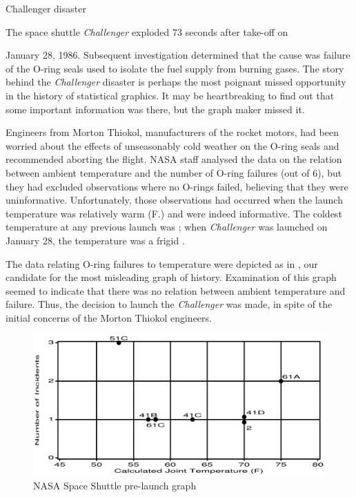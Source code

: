 \begin{Example}[nasa]{Challenger disaster}
\begin{changebar}
The space shuttle \emph{Challenger} exploded 73 seconds after take-off on
\end{changebar} 
January 28, 1986.
Subsequent investigation determined that the cause was failure of the O-ring
seals used to isolate the fuel supply from burning gases.
The story behind the \emph{Challenger} disaster is perhaps the most poignant
missed opportunity in the history of statistical graphics.
It may be heartbreaking to find out that some important information
was there, but the graph maker missed it.

Engineers from Morton Thiokol, manufacturers of the rocket motors,
had been worried about the effects of unseasonably cold weather
on the O-ring seals and recommended aborting the flight.
NASA staff analysed the data on the relation between ambient temperature
and the number of O-ring failures (out of 6), but they had excluded observations
where no O-rings failed,
believing that they were uninformative.
Unfortunately, those observations had occurred when the launch temperature
was relatively warm (F.) and were indeed informative.
The coldest temperature at any previous launch was ;  when \emph{Challenger} was launched on January 28,
the temperature was a frigid .

The data relating O-ring failures to temperature were depicted as in
, our candidate for the most misleading graph of history.
Examination of this graph seemed to indicate that there was no relation
between ambient temperature and failure.  Thus, the decision to launch
the \emph{Challenger} was made, in spite of the initial concerns
of the Morton Thiokol engineers.
\begin{figure}[htb]
  \centering
  \includegraphics[width=\textwidth,clip]{ch6/fig/nasa0}
  \caption{NASA Space Shuttle pre-launch graph}\label{fig:nasa0}
\end{figure}


\end{Example}
